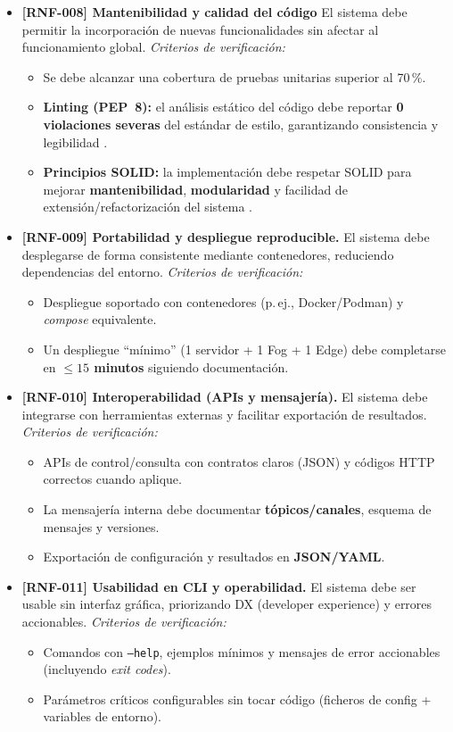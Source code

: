 \documentclass{report}
\begin{document}
\begin{itemize}
  \item \textbf{[RNF-008] Mantenibilidad y calidad del código}  
  El sistema debe permitir la incorporación de nuevas funcionalidades sin afectar al funcionamiento global.  
  \textit{Criterios de verificación:}
  \begin{itemize}
    \item Se debe alcanzar una cobertura de pruebas unitarias superior al 70\,\%.
  \item \textbf{Linting (PEP~8):} el análisis estático del código debe reportar \textbf{0 violaciones severas} del estándar de estilo, garantizando consistencia y legibilidad \cite{pep8}.
  \item \textbf{Principios SOLID:} la implementación debe respetar SOLID para mejorar \textbf{mantenibilidad}, \textbf{modularidad} y facilidad de extensión/refactorización del sistema \cite{martin2008clean}.
  \end{itemize}
  
  \item \textbf{[RNF-009] Portabilidad y despliegue reproducible.}  
  El sistema debe desplegarse de forma consistente mediante contenedores, reduciendo dependencias del entorno.
  \textit{Criterios de verificación:}
  \begin{itemize}
    \item Despliegue soportado con contenedores (p.\,ej., Docker/Podman) y \textit{compose} equivalente.
    \item Un despliegue ``mínimo'' (1 servidor + 1 Fog + 1 Edge) debe completarse en \textbf{$\leq 15$ minutos} siguiendo documentación.
  \end{itemize}

  \item \textbf{[RNF-010] Interoperabilidad (APIs y mensajería).}  
  El sistema debe integrarse con herramientas externas y facilitar exportación de resultados.
  \textit{Criterios de verificación:}
  \begin{itemize}
    \item APIs de control/consulta con contratos claros (JSON) y códigos HTTP correctos cuando aplique.
    \item La mensajería interna debe documentar \textbf{tópicos/canales}, esquema de mensajes y versiones.
    \item Exportación de configuración y resultados en \textbf{JSON/YAML}.
  \end{itemize}

  \item \textbf{[RNF-011] Usabilidad en CLI y operabilidad.}  
  El sistema debe ser usable sin interfaz gráfica, priorizando DX (developer experience) y errores accionables.
  \textit{Criterios de verificación:}
  \begin{itemize}
    \item Comandos con \texttt{--help}, ejemplos mínimos y mensajes de error accionables (incluyendo \textit{exit codes}).
    \item Parámetros críticos configurables sin tocar código (ficheros de config + variables de entorno).
  \end{itemize}


\end{itemize}
\end{document}
